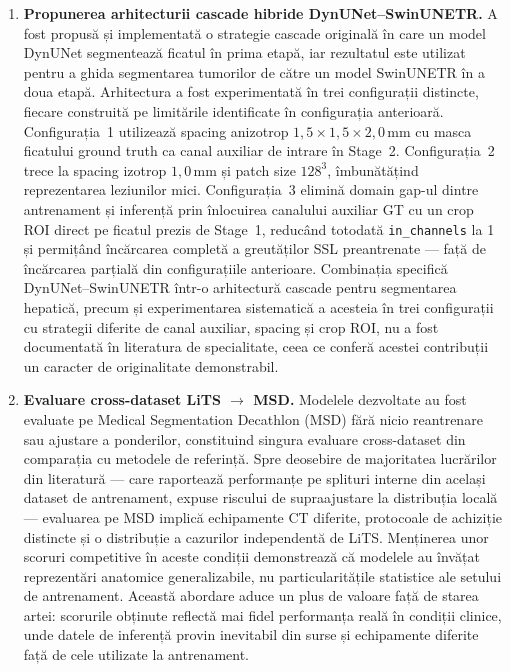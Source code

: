 \documentclass[12pt, a4paper]{report}
\begin{document}
\begin{enumerate}
\item \textbf{Propunerea arhitecturii cascade hibride
    DynUNet–SwinUNETR.} A fost propusă și implementată o strategie
    cascade originală în care un model DynUNet segmentează ficatul
    în prima etapă, iar rezultatul este utilizat pentru a ghida
    segmentarea tumorilor de către un model SwinUNETR în a doua
    etapă. Arhitectura a fost experimentată în trei configurații
    distincte, fiecare construită pe limitările identificate în
    configurația anterioară. Configurația~1 utilizează spacing
    anizotrop $1{,}5\times1{,}5\times2{,}0$\,mm cu masca ficatului
    ground truth ca canal auxiliar de intrare în Stage~2.
    Configurația~2 trece la spacing izotrop $1{,}0$\,mm și patch
    size $128^3$, îmbunătățind reprezentarea leziunilor mici.
    Configurația~3 elimină domain gap-ul dintre antrenament și
    inferență prin înlocuirea canalului auxiliar GT cu un crop ROI
    direct pe ficatul prezis de Stage~1, reducând totodată
    \texttt{in\_channels} la 1 și permițând încărcarea completă
    a greutăților SSL preantrenate — față de încărcarea parțială
    din configurațiile anterioare. Combinația specifică
    DynUNet–SwinUNETR într-o arhitectură cascade pentru
    segmentarea hepatică, precum și experimentarea sistematică
    a acesteia în trei configurații cu strategii diferite de
    canal auxiliar, spacing și crop ROI, nu a fost documentată
    în literatura de specialitate, ceea ce conferă acestei
    contribuții un caracter de originalitate demonstrabil.


\item \textbf{Evaluare cross-dataset LiTS $\to$ MSD.}
    Modelele dezvoltate au fost evaluate pe Medical Segmentation
    Decathlon (MSD) fără nicio reantrenare sau ajustare a
    ponderilor, constituind singura evaluare cross-dataset din
    comparația cu metodele de referință. Spre deosebire de
    majoritatea lucrărilor din literatură — care raportează
    performanțe pe splituri interne din același dataset de
    antrenament, expuse riscului de supraajustare la distribuția
    locală — evaluarea pe MSD implică echipamente CT diferite,
    protocoale de achiziție distincte și o distribuție a cazurilor
    independentă de LiTS. Menținerea unor scoruri competitive în
    aceste condiții demonstrează că modelele au învățat
    reprezentări anatomice generalizabile, nu particularitățile
    statistice ale setului de antrenament. Această abordare aduce
    un plus de valoare față de starea artei: scorurile obținute
    reflectă mai fidel performanța reală în condiții clinice, unde
    datele de inferență provin inevitabil din surse și echipamente
    diferite față de cele utilizate la antrenament.



\end{enumerate}
\end{document}
